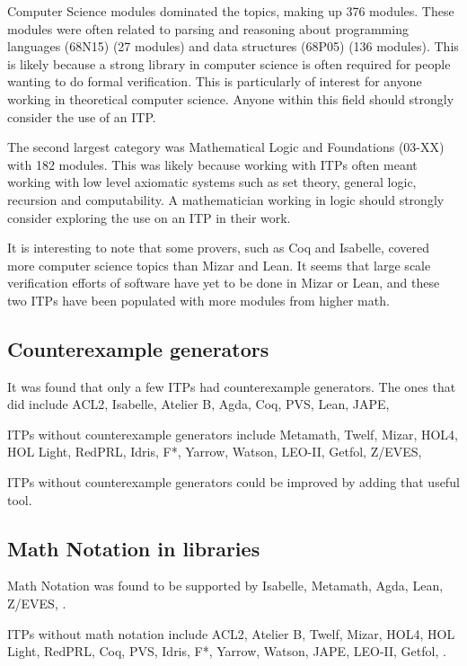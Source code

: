 \documentclass[
]{article}
\begin{document}
Computer Science modules dominated the topics, making up 376 modules.
These modules were often related to parsing and reasoning about
programming languages (68N15) (27 modules) and data structures (68P05)
(136 modules). This is likely because a strong library in computer
science is often required for people wanting to do formal verification.
This is particularly of interest for anyone working in theoretical
computer science. Anyone within this field should strongly consider the
use of an ITP.

The second largest category was Mathematical Logic and Foundations
(03-XX) with 182 modules. This was likely because working with ITPs
often meant working with low level axiomatic systems such as set theory,
general logic, recursion and computability. A mathematician working in
logic should strongly consider exploring the use on an ITP in their
work.

It is interesting to note that some provers, such as Coq and Isabelle,
covered more computer science topics than Mizar and Lean. It seems that
large scale verification efforts of software have yet to be done in
Mizar or Lean, and these two ITPs have been populated with more modules
from higher math.

\hypertarget{sec:counterexamples}{%
\subsection{Counterexample generators}\label{sec:counterexamples}}

It was found that only a few ITPs had counterexample generators. The
ones that did include ACL2, Isabelle, Atelier B, Agda, Coq, PVS, Lean,
JAPE,

ITPs without counterexample generators include Metamath, Twelf, Mizar,
HOL4, HOL Light, RedPRL, Idris, F*, Yarrow, Watson, LEO-II, Getfol,
Z/EVES,

ITPs without counterexample generators could be improved by adding that
useful tool.

\hypertarget{sec:math_notation}{%
\subsection{Math Notation in libraries}\label{sec:math_notation}}

Math Notation was found to be supported by Isabelle, Metamath, Agda,
Lean, Z/EVES, .

ITPs without math notation include ACL2, Atelier B, Twelf, Mizar, HOL4,
HOL Light, RedPRL, Coq, PVS, Idris, F*, Yarrow, Watson, JAPE, LEO-II,
Getfol, .
\end{document}
